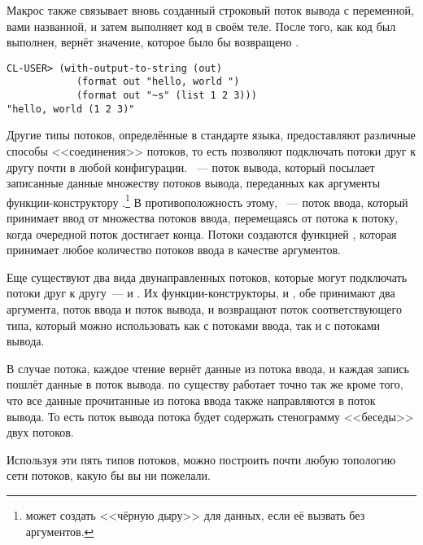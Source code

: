 Макрос  также связывает вновь созданный строковый поток вывода
с переменной, вами названной, и затем выполняет код в своём теле. После того, как код был
выполнен,  вернёт значение, которое было бы возвращено
.
 
\begin{lstlisting}
CL-USER> (with-output-to-string (out) 
            (format out "hello, world ") 
            (format out "~s" (list 1 2 3))) 
"hello, world (1 2 3)" 
\end{lstlisting}

Другие типы потоков, определённые в стандарте языка, предоставляют различные способы
<<соединения>> потоков, то есть позволяют подключать потоки друг к другу почти в любой
конфигурации. ~--- поток вывода, который посылает записанные данные
множеству потоков вывода, переданных как аргументы функции-конструктору
.\footnote{ может создать <<чёрную
  дыру>> для данных, если её вызвать без аргументов.} В противоположность этому,
~--- поток ввода, который принимает ввод от множества потоков
ввода, перемещаясь от потока к потоку, когда очередной поток достигает конца. Потоки
 создаются функцией , которая
принимает любое количество потоков ввода в качестве аргументов.

Еще существуют два вида двунаправленных потоков, которые могут подключать потоки друг к
другу~---  и . Их функции-конструкторы,
 и , обе принимают два аргумента, поток
ввода и поток вывода, и возвращают поток соответствующего типа, который можно использовать
как с потоками ввода, так и с потоками вывода.

В случае  потока, каждое чтение вернёт данные из потока ввода, и
каждая запись пошлёт данные в поток вывода.  по существу работает точно
так же кроме того, что все данные прочитанные из потока ввода также направляются в поток
вывода. То есть поток вывода потока  будет содержать стенограмму
<<беседы>> двух потоков.

Используя эти пять типов потоков, можно построить почти любую топологию сети потоков,
какую бы вы ни пожелали.

